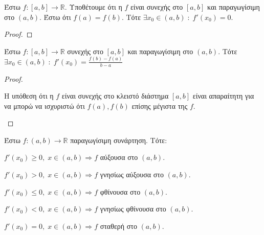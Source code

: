 \documentclass[main.tex]{subfiles}
\begin{document}
\begin{thm}[Rolle]
    Έστω $ f \colon [a,b] \to \mathbb{R} $. Υποθέτουμε ότι η $ f $ είναι συνεχής 
    στο $ [a,b] $ και παραγωγίσιμη στο $ (a,b) $. Έστω ότι $ f(a)=f(b) $. Τότε
    $ \exists x_{0} \in (a,b) \; : \; f'(x_{0}) = 0 $.
\end{thm}

\begin{proof}

\end{proof}

\begin{thm}
    Έστω $ f \colon [a,b] \to \mathbb{R} $ συνεχής στο $ [a,b] $ και παραγωγίσιμη 
    στο $ (a,b) $. Τότε $ \exists x_{0} \in (a,b) \; : \; f'(x_{0}) = 
    \frac{f(b)-f(a)}{b-a} $
\end{thm}

\begin{proof}
    \begin{rem}
        Η υπόθεση ότι η $f$ είναι συνεχής στο κλειστό διάστημα $ [a,b] $ είναι 
        απαραίτητη για να μπορώ να ισχυριστώ ότι $ f(a), f(b) $ επίσης 
        μέγιστα της $f$.
    \end{rem}   
\end{proof}

\begin{thm}
    Έστω $ f \colon (a,b) \to \mathbb{R} $ παραγωγίσιμη συνάρτηση. Τότε:
    \begin{myitemize}
    \item $ f'(x_{0}) \geq 0, \; x \in (a,b) \Rightarrow f $ αύξουσα στο $ (a,b) $.
    \item $ f'(x_{0}) > 0, \; x \in (a,b) \Rightarrow f $ γνησίως αύξουσα στο 
        $ (a,b) $.
    \item $ f'(x_{0}) \leq 0, \; x \in (a,b) \Rightarrow f $ φθίνουσα στο $ (a,b) $.
    \item $ f'(x_{0}) < 0, \; x \in (a,b) \Rightarrow f$ γνησίως φθίνουσα στο 
        $ (a,b) $.
    \item $ f'(x_{0}) = 0, \; x \in (a,b) \Rightarrow f $ σταθερή στο $ (a,b) $.
    \end{myitemize}
\end{thm}
\end{document}
